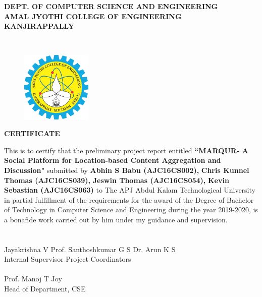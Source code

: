 \begin{titlepage}
\begin{center}
\begin{large}
\textbf{DEPT. OF COMPUTER SCIENCE AND ENGINEERING}\\[0.2cm]
\textbf{AMAL JYOTHI COLLEGE OF ENGINEERING}\\
\textbf{KANJIRAPPALLY}
\end{large}\\[0.5cm]
\vspace{.8cm}
\begin{figure}[h]
\center
\includegraphics[width=0.30\textwidth]{./ajcelogo}\\[0.5cm]
\vspace{0.3cm}
\end{figure}
\Large\textbf{CERTIFICATE}\\
\normalsize
\end{center}
\normalsize
\vspace{0.5cm}
This is to certify that the preliminary project report entitled  {\large \textbf{``MARQUR- A Social Platform for Location-based Content Aggregation and Discussion"} } submitted by \textbf{Abhin S Babu (AJC16CS002), }\textbf{Chris Kunnel Thomas (AJC16CS039), } \textbf{Jeswin Thomas (AJC16CS054), }\textbf{Kevin Sebastian (AJC16CS063)} to The APJ Abdul Kalam Technological University in partial fulfillment of the requirements for the award of the Degree of Bachelor of Technology in Computer Science and Engineering during the year 2019-2020, is a bonafide work carried out by him under my guidance and supervision. 
\\\\\\
\hspace{1pt}Jayakrishna V
\hspace{150pt}Prof. Santhoshkumar G S\hspace{5pt} Dr. Arun K S\\
\vspace{0.5pt}
\hspace{0pt}Internal Supervisor 
\hspace{170pt}Project Coordinators \\\\
\vspace{2pt} 
\hspace{150pt}Prof. Manoj T Joy \\
\vspace{0.5pt}
\hspace{130pt} Head of Department, CSE
\end{titlepage}

